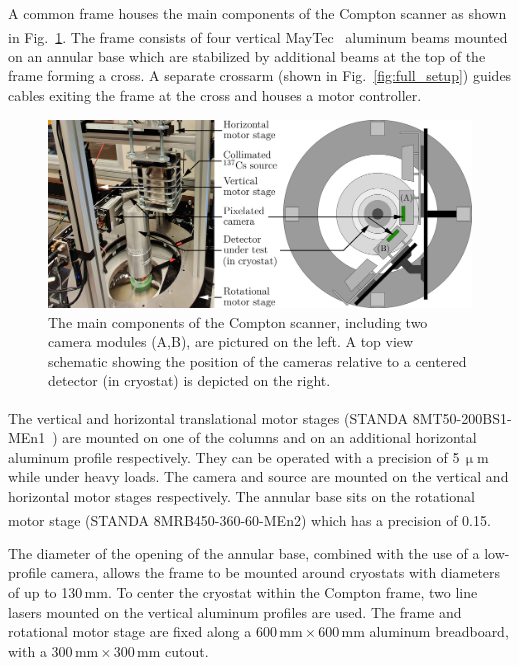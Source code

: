 A common frame houses the main components of the Compton scanner as shown in Fig.~\ref{fig:comptonscanner}. The frame consists of four vertical MayTec\textsuperscript{\tiny\textregistered}~\cite{maytec} aluminum beams mounted on an annular base which are stabilized by additional beams at the top of the frame forming a cross. A separate crossarm (shown in Fig.~\ref{fig:full_setup}) guides cables exiting the frame at the cross and houses a motor controller. 
\begin{figure}[tbh]
    \centering
    \includegraphics[width=6in]{figs/scanner/ComptonScannerSetup_updated_labeled_width_6_9in.png}
    \caption{The main components of the Compton scanner, including two camera modules (A,B), are pictured on the left. A top view schematic showing the position of the cameras relative to a centered detector (in cryostat) is depicted on the right.}
    \label{fig:comptonscanner}
\end{figure}

The vertical and horizontal translational motor stages (STANDA\textsuperscript{\tiny\textregistered} 8MT50-200BS1-MEn1~\cite{standa}) are mounted on one of the columns and on an additional horizontal aluminum profile respectively. They can be operated with a precision of 5\,$\upmu$m while under heavy loads. The camera and source are mounted on the vertical and horizontal motor stages respectively. The annular base sits on the rotational motor stage (STANDA\textsuperscript{\tiny\textregistered} 8MRB450-360-60-MEn2) which has a precision of 0.15\textdegree. 

The diameter of the opening of the annular base, combined with the use of a low-profile camera, allows the frame to be mounted around cryostats with diameters of up to 130\,mm. To center the cryostat within the Compton frame, two line lasers mounted on the vertical aluminum profiles are used. The frame and rotational motor stage are fixed along a $600\,\text{mm} \times 600\,\text{mm}$ aluminum breadboard, with a $300\,\text{mm} \times 300\,\text{mm}$ cutout.

